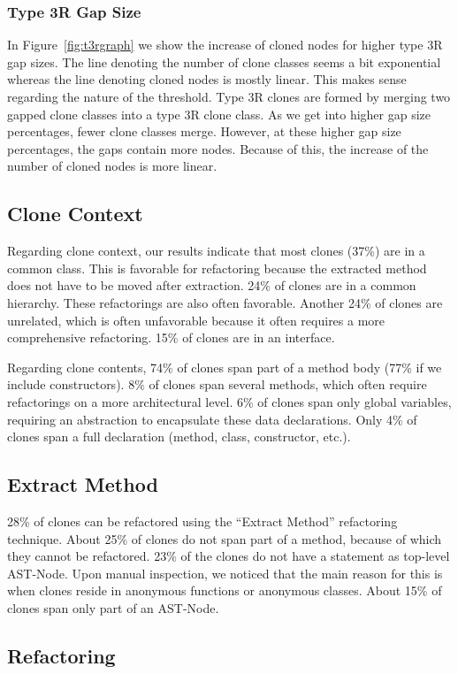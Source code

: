 \subsubsection{Type 3R Gap Size}
In Figure~\ref{fig:t3rgraph} we show the increase of cloned nodes for higher type 3R gap sizes. The line denoting the number of clone classes seems a bit exponential whereas the line denoting cloned nodes is mostly linear. This makes sense regarding the nature of the threshold. Type 3R clones are formed by merging two gapped clone classes into a type 3R clone class. As we get into higher gap size percentages, fewer clone classes merge. However, at these higher gap size percentages, the gaps contain more nodes. Because of this, the increase of the number of cloned nodes is more linear.

\subsection{Clone Context}
Regarding clone context, our results indicate that most clones (37\%) are in a common class. This is favorable for refactoring because the extracted method does not have to be moved after extraction. 24\% of clones are in a common hierarchy. These refactorings are also often favorable. Another 24\% of clones are unrelated, which is often unfavorable because it often requires a more comprehensive refactoring. 15\% of clones are in an interface.

Regarding clone contents, 74\% of clones span part of a method body (77\% if we include constructors). 8\% of clones span several methods, which often require refactorings on a more architectural level. 6\% of clones span only global variables, requiring an abstraction to encapsulate these data declarations. Only 4\% of clones span a full declaration (method, class, constructor, etc.).

\subsection{Extract Method}
28\% of clones can be refactored using the ``Extract Method'' refactoring technique. About 25\% of clones do not span part of a method, because of which they cannot be refactored. 23\% of the clones do not have a statement as top-level AST-Node. Upon manual inspection, we noticed that the main reason for this is when clones reside in anonymous functions or anonymous classes. About 15\% of clones span only part of an AST-Node.

\subsection{Refactoring}

